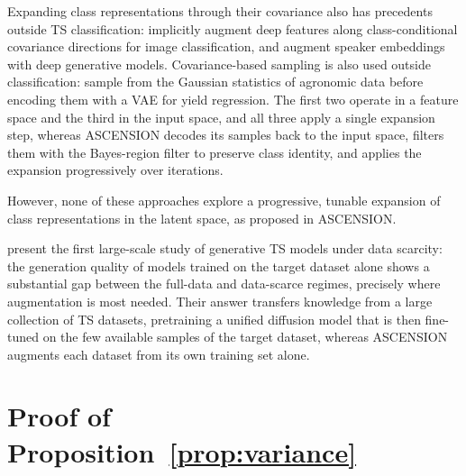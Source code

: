 Expanding class representations through their covariance also has
precedents outside TS classification: \citet{wang2019implicit}
implicitly augment deep features along class-conditional covariance
directions for image classification, and \citet{wang2020data} augment
speaker embeddings with deep generative models. Covariance-based
sampling is also used outside classification: \citet{lan2025cotton}
sample from the Gaussian statistics of agronomic data before
encoding them with a VAE for yield regression. The first two
operate in a feature space and the third in the input space, and
all three apply a single expansion step,
whereas ASCENSION decodes its samples back to the input space,
filters them with the Bayes-region filter to preserve class identity,
and applies the expansion progressively over iterations.

However, none of these approaches explore a
progressive, tunable expansion of class representations in the
latent space, as proposed in ASCENSION.

\citet{gonen2025time} present the first large-scale study of
generative TS models under data scarcity: the generation quality of models trained on the target
dataset alone shows a substantial gap between the full-data and
data-scarce regimes, precisely where augmentation is most needed. Their answer transfers
knowledge from a large collection of TS datasets, pretraining a
unified diffusion model that is then fine-tuned on the few available
samples of the target dataset, whereas ASCENSION augments each
dataset from its own training set alone.



\section{Proof of Proposition~\ref{prop:variance}}
\label{app:variance-proof}

